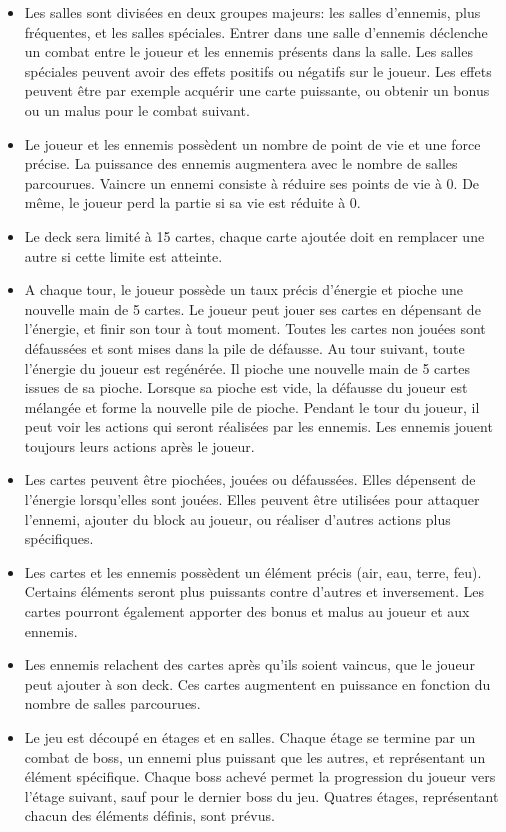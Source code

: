 \begin{itemize}
    \item Les salles sont divisées en deux groupes majeurs: les salles d'ennemis, plus fréquentes, et les salles spéciales. Entrer dans une salle d'ennemis déclenche un combat entre le joueur et les ennemis présents dans la salle. Les salles spéciales peuvent avoir des effets positifs ou négatifs sur le joueur. Les effets peuvent être par exemple acquérir une carte puissante, ou obtenir un bonus ou un malus pour le combat suivant.
    \item Le joueur et les ennemis possèdent un nombre de point de vie et une force précise. La puissance des ennemis augmentera avec le nombre de salles parcourues. Vaincre un ennemi consiste à réduire ses points de vie à 0. De même, le joueur perd la partie si sa vie est réduite à 0.
    \item Le deck sera limité à 15 cartes, chaque carte ajoutée doit en remplacer une autre si cette limite est atteinte.
    \item A chaque tour, le joueur possède un taux précis d'énergie et pioche une nouvelle main de 5 cartes. Le joueur peut jouer ses cartes en dépensant de l'énergie, et finir son tour à tout moment. Toutes les cartes non jouées sont défaussées et sont mises dans la pile de défausse. Au tour suivant, toute l'énergie du joueur est regénérée. Il pioche une nouvelle main de 5 cartes issues de sa pioche. Lorsque sa pioche est vide, la défausse du joueur est mélangée et forme la nouvelle pile de pioche. Pendant le tour du joueur, il peut voir les actions qui seront réalisées par les ennemis. Les ennemis jouent toujours leurs actions après le joueur.
    \item Les cartes peuvent être piochées, jouées ou défaussées. Elles dépensent de l'énergie lorsqu'elles sont jouées. Elles peuvent être utilisées pour attaquer l'ennemi, ajouter du block au joueur, ou réaliser d'autres actions plus spécifiques.
    \item Les cartes et les ennemis possèdent un élément précis (air, eau, terre, feu). Certains éléments seront plus puissants contre d'autres et inversement. Les cartes pourront également apporter des bonus et malus au joueur et aux ennemis.
    \item Les ennemis relachent des cartes après qu'ils soient vaincus, que le joueur peut ajouter à son deck. Ces cartes augmentent en puissance en fonction du nombre de salles parcourues.
    \item Le jeu est découpé en étages et en salles. Chaque étage se termine par un combat de boss, un ennemi plus puissant que les autres, et représentant un élément spécifique. Chaque boss achevé permet la progression du joueur vers l'étage suivant, sauf pour le dernier boss du jeu. Quatres étages, représentant chacun des éléments définis, sont prévus.

\end{itemize}


